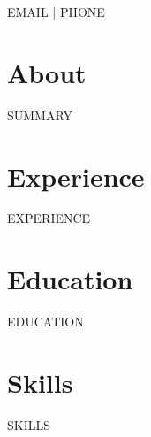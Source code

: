 \documentclass[11pt]{article}
\begin{document}
{\Huge {}}

{{EMAIL}} | {{PHONE}}

\section*{\color{blue}About}
{{SUMMARY}}

\section*{\color{blue}Experience}
{{EXPERIENCE}}

\section*{\color{blue}Education}
{{EDUCATION}}

\section*{\color{blue}Skills}
{{SKILLS}}
\end{document}
